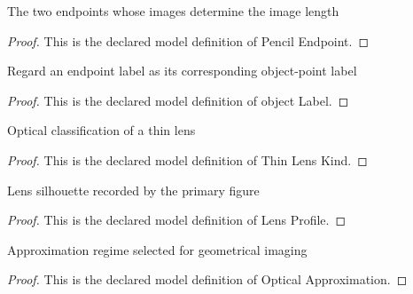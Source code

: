 \begin{definition}
  \label{def:physics:phyx-mini-0115:phyxminiproblems-problemphyxmini0115-pencilendpoint}
  The two endpoints whose images determine the image length
\end{definition}
\begin{proof}
  This is the declared model definition of Pencil Endpoint.
\end{proof}
\begin{definition}
  \label{def:physics:phyx-mini-0115:phyxminiproblems-problemphyxmini0115-pencilendpoint-objectlabel}
  Regard an endpoint label as its corresponding object-point label
\end{definition}
\begin{proof}
  This is the declared model definition of object Label.
\end{proof}
\begin{definition}
  \label{def:physics:phyx-mini-0115:phyxminiproblems-problemphyxmini0115-thinlenskind}
  Optical classification of a thin lens
\end{definition}
\begin{proof}
  This is the declared model definition of Thin Lens Kind.
\end{proof}
\begin{definition}
  \label{def:physics:phyx-mini-0115:phyxminiproblems-problemphyxmini0115-lensprofile}
  Lens silhouette recorded by the primary figure
\end{definition}
\begin{proof}
  This is the declared model definition of Lens Profile.
\end{proof}
\begin{definition}
  \label{def:physics:phyx-mini-0115:phyxminiproblems-problemphyxmini0115-opticalapproximation}
  Approximation regime selected for geometrical imaging
\end{definition}
\begin{proof}
  This is the declared model definition of Optical Approximation.
\end{proof}
